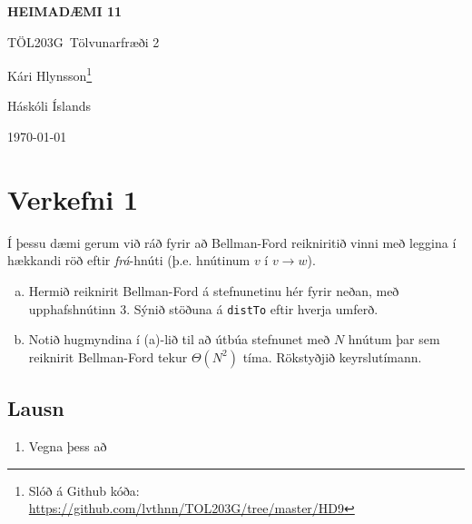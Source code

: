 \documentclass[12pt, a4paper, hidelinks]{article}
\newcommand{\doctitle}{\uppercase{Heimadæmi 11}}
\newcommand{\coursename}{Tölvunarfræði 2}
\newcommand{\coursenum}{TÖL203G}
\begin{document}
\thispagestyle{plain}
\centerline{\bfseries\Large\doctitle}
\medskip
\centerline{\large\coursenum\ \coursename}
\bigskip

\centerline{\large Kári Hlynsson\footnote{Slóð á Github kóða: \url{https://github.com/lvthnn/TOL203G/tree/master/HD9}}}
\bigskip
\centerline{Háskóli Íslands}
\medskip
\centerline{\today}

\section*{Verkefni 1}
Í þessu dæmi gerum við ráð fyrir að Bellman-Ford reikniritið vinni með leggina í hækkandi röð eftir \emph{frá}-hnúti (þ.e. hnútinum $v$ í $v \to w$).
\begin{enumerate}[(a)]
    \item Hermið reiknirit Bellman-Ford á stefnunetinu hér fyrir neðan, með upphafshnútinn 3. Sýnið stöðuna á \texttt{distTo} eftir hverja umferð.

    \item Notið hugmyndina í (a)-lið til að útbúa stefnunet með $N$ hnútum þar sem reiknirit Bellman-Ford tekur $\Theta(N^2)$ tíma. Rökstyðjið keyrslutímann.
\end{enumerate}

\subsection*{Lausn}
\begin{enumerate}
    \item Vegna þess að 
\end{enumerate}
\end{document}
